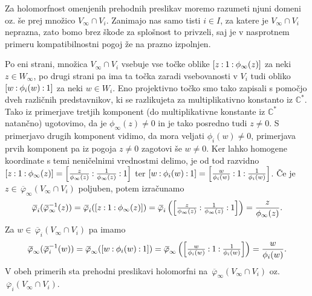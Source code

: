 \documentclass[mat1]{fmfdelo}
\numberwithin{equation}{section}
\newcommand{\CM}{\mathbb C ^*}
\newcommand{\inv}{^{-1}}
\newcommand{\pcoor}[1]{%
\begingroup\lccode`~=`: \lowercase{\endgroup
\edef~}{\mathbin{\mathchar\the\mathcode`:}\nobreak}%
\left[%
\begingroup
\mathcode`:=\string"8000
#1%
\endgroup
\right]%
}
\newcommand{\olsi}[1]{\,\overline{\!{#1}}} %
\theoremstyle{definition}
\begin{document}
Za holomorfnost omenjenih prehodnih preslikav moremo razumeti njuni domeni oz. še prej množico $V_\infty \cap V_i$. Zanimajo nas samo tisti $i \in I$, za katere je $V_\infty \cap V_i$ neprazna, zato bomo brez škode za splošnost to privzeli, saj je v nasprotnem primeru kompatibilnostni pogoj že na prazno izpolnjen. 

Po eni strani, množica $V_\infty \cap V_i$ vsebuje vse točke oblike $\pcoor{z : 1 : \phi_\infty(z)}$ za neki $z \in W_\infty$, po drugi strani pa ima ta točka zaradi vsebovanosti v $V_i$ tudi obliko $\pcoor{w : \phi_i(w) : 1}$ za neki $w \in W_i$. Eno projektivno točko smo tako zapisali s pomočjo dveh različnih predstavnikov, ki se razlikujeta za multiplikativno konstanto iz $\CM$. Tako iz primerjave tretjih komponent (do multiplikativne konstante iz $\CM$ natančno) ugotovimo, da je $\phi_\infty(z) \neq 0$ in je tako posredno tudi $z \neq 0$. S primerjavo drugih komponent vidimo, da mora veljati $\phi_i(w) \neq 0$, primerjava prvih komponent pa iz pogoja $z \neq 0$ zagotovi še $w \neq 0$. Ker lahko homogene koordinate s temi neničelnimi vrednostmi delimo, je od tod razvidno $\pcoor{z : 1 : \phi_\infty(z)} = \pcoor{\tfrac{z}{\phi_\infty(z)} : \tfrac{1}{\phi_\infty(z)} : 1}$ ter $\pcoor{w : \phi_i(w) : 1} = \pcoor{\tfrac{w}{\phi_i(w)} : 1 : \tfrac{1}{\phi_i(w)}}$. 
Če je $z \in \olsi{\varphi}_\infty(V_\infty \cap V_i)$ poljuben, potem izračunamo 
\[
    \olsi{\varphi}_i (\olsi{\varphi}_\infty\inv (z)) = 
    \olsi{\varphi}_i (\pcoor{z : 1 : \phi_\infty(z)}) = 
    \olsi{\varphi}_i \left(\pcoor{\tfrac{z}{\phi_\infty(z)} : \tfrac{1}{\phi_\infty(z)} : 1}\right) = 
    \frac{z}{\phi_\infty(z)}.
\]
Za $w \in \olsi{\varphi}_i(V_\infty \cap V_i)$ pa imamo
\[
    \olsi{\varphi}_\infty (\olsi{\varphi}_i\inv(w)) =
    \olsi{\varphi}_\infty (\pcoor{w : \phi_i(w) : 1}) =
    \olsi{\varphi}_\infty \left(\pcoor{\tfrac{w}{\phi_i(w)} : 1 : \tfrac{1}{\phi_i(w)}}\right) =
    \frac{w}{\phi_i(w)}.
\]
V obeh primerih sta prehodni preslikavi holomorfni na $\olsi{\varphi}_\infty(V_\infty \cap V_i)$ oz. $\olsi{\varphi}_i(V_\infty \cap V_i)$.
\end{document}
